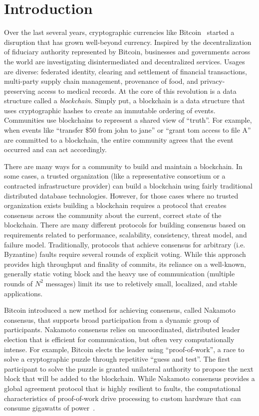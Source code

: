 \section{Introduction}
\label{sec_introduction}

Over the last several years, cryptographic currencies like Bitcoin~\cite{} started a disruption that has grown
well-beyond currency. Inspired by the decentralization of fiduciary authority represented by Bitcoin, businesses and
governments across the world are investigating disintermediated and decentralized services. Usages are diverse:
federated identity, clearing and settlement of financial transactions, multi-party supply chain management, provenance
of food, and privacy-preserving access to medical records. At the core of this revolution is a data structure called a
{\it blockchain}. Simply put, a blockchain is a data structure that uses cryptographic hashes to create an immutable
ordering of events. Communities use blockchains to represent a shared view of ``truth''. For example, when events like
``transfer \$50 from john to jane'' or ``grant tom access to file A'' are committed to a blockchain, the entire
community agrees that the event occurred and can act accordingly.

There are many ways for a community to build and maintain a blockchain. In some cases, a trusted organization (like a
representative consortium or a contracted infrastructure provider) can build a blockchain using fairly traditional
distributed database technologies. However, for those cases where no trusted organization exists building a blockchain
requires a protocol that creates consensus across the community about the current, correct state of the blockchain.
There are many different protocols for building consensus based on requirements related to performance, scalability,
consistency, threat model, and failure model. Traditionally, protocols that achieve consensus for arbitrary
(i.e. Byzantine) faults require several rounds of explicit voting. While this approach provides high throughput and
finality of commits, its reliance on a well-known, generally static voting block and the heavy use of communication
(multiple rounds of $N^2$ messages) limit its use to reletively small, localized, and stable applications. 

Bitcoin introduced a new method for achieving consensus, called Nakamoto consensus, that supports broad participation
from a dynamic group of participants. Nakamoto consensus relies on uncoordinated, distributed leader election that is
efficient for communication, but often very computationally intense. For example, Bitcoin elects the leader using
``proof-of-work'', a race to solve a cryptographic puzzle through repetitive ``guess and test''. The first participant
to solve the puzzle is granted unilateral authority to propose the next block that will be added to the blockchain.
While Nakamoto consensus provides a global agreement protocol that is highly resilient to faults, the computational
characteristics of proof-of-work drive processing to custom hardware that can consume gigawatts of power~\cite{}.

